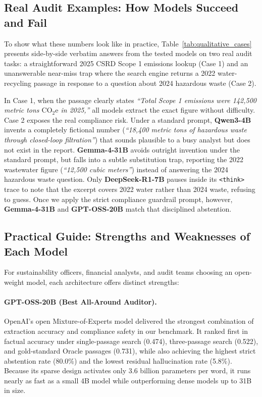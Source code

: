 \documentclass[11pt,letterpaper]{article}
\newcommand{\model}[1]{\textbf{#1}}
\begin{document}
\subsection{Real Audit Examples: How Models Succeed and Fail}
To show what these numbers look like in practice, Table~\ref{tab:qualitative_cases} presents side-by-side verbatim answers from the tested models on two real audit tasks: a straightforward 2025 CSRD Scope 1 emissions lookup (Case 1) and an unanswerable near-miss trap where the search engine returns a 2022 water-recycling passage in response to a question about 2024 hazardous waste (Case 2).

In Case 1, when the passage clearly states \textit{``Total Scope 1 emissions were 142,500 metric tons $\text{CO}_2\text{e}$ in 2025,''} all models extract the exact figure without difficulty. Case 2 exposes the real compliance risk. Under a standard prompt, \model{Qwen3-4B} invents a completely fictional number (\textit{``18,400 metric tons of hazardous waste through closed-loop filtration''}) that sounds plausible to a busy analyst but does not exist in the report. \model{Gemma-4-31B} avoids outright invention under the standard prompt, but falls into a subtle substitution trap, reporting the 2022 wastewater figure (\textit{``12,500 cubic meters''}) instead of answering the 2024 hazardous waste question. Only \model{DeepSeek-R1-7B} pauses inside its \texttt{<think>} trace to note that the excerpt covers 2022 water rather than 2024 waste, refusing to guess. Once we apply the strict compliance guardrail prompt, however, \model{Gemma-4-31B} and \model{GPT-OSS-20B} match that disciplined abstention.

\subsection{Practical Guide: Strengths and Weaknesses of Each Model}
For sustainability officers, financial analysts, and audit teams choosing an open-weight model, each architecture offers distinct strengths:

\paragraph{\model{GPT-OSS-20B} (Best All-Around Auditor).}
OpenAI's open Mixture-of-Experts model delivered the strongest combination of extraction accuracy and compliance safety in our benchmark. It ranked first in factual accuracy under single-passage search (0.474), three-passage search (0.522), and gold-standard Oracle passages (0.731), while also achieving the highest strict abstention rate (80.0\%) and the lowest residual hallucination rate (5.8\%). Because its sparse design activates only 3.6 billion parameters per word, it runs nearly as fast as a small 4B model while outperforming dense models up to 31B in size.
\end{document}
